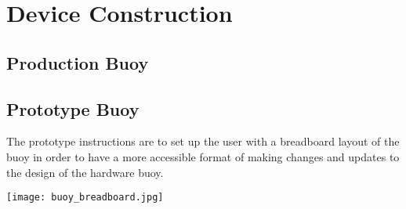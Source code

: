 \section{Device Construction}

\subsection{Production Buoy}

\subsection{Prototype Buoy}

\begin{flushleft}
    The prototype instructions are to set up the user with a breadboard layout of the buoy in order to have a more 
    accessible format of making changes and updates to the design of the hardware buoy.
\end{flushleft}

\texttt{[image: buoy\_breadboard.jpg]}

